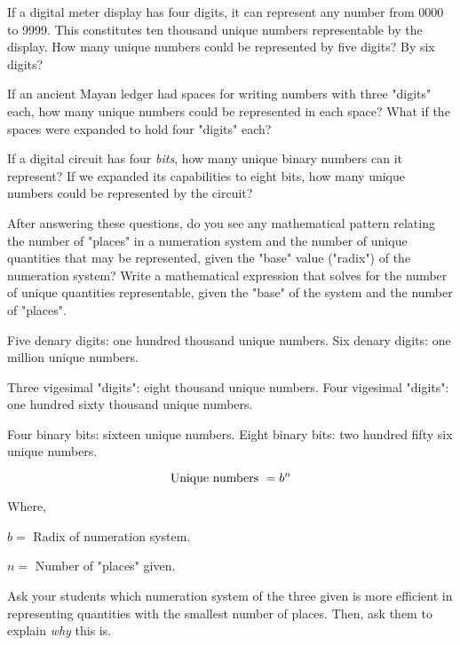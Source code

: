 

If a digital meter display has four digits, it can represent any number from 0000 to 9999.  This constitutes ten thousand unique numbers representable by the display.  How many unique numbers could be represented by five digits?  By six digits?  

If an ancient Mayan ledger had spaces for writing numbers with three "digits" each, how many unique numbers could be represented in each space?  What if the spaces were expanded to hold four "digits" each?

If a digital circuit has four {\it bits}, how many unique binary numbers can it represent?  If we expanded its capabilities to eight bits, how many unique numbers could be represented by the circuit?

\vskip 10pt

After answering these questions, do you see any mathematical pattern relating the number of "places" in a numeration system and the number of unique quantities that may be represented, given the "base" value ("radix") of the numeration system?  Write a mathematical expression that solves for the number of unique quantities representable, given the "base" of the system and the number of "places".







Five denary digits: one hundred thousand unique numbers.  Six denary digits: one million unique numbers.

\vskip 10pt

Three vigesimal "digits": eight thousand unique numbers.  Four vigesimal "digits": one hundred sixty thousand unique numbers.

\vskip 10pt

Four binary bits: sixteen unique numbers.  Eight binary bits: two hundred fifty six unique numbers.

\vskip 10pt

$$\hbox{Unique numbers } = b^n$$

\noindent
Where,

$b =$ Radix of numeration system.

$n =$ Number of "places" given.







Ask your students which numeration system of the three given is more efficient in representing quantities with the smallest number of places.  Then, ask them to explain {\it why} this is.




